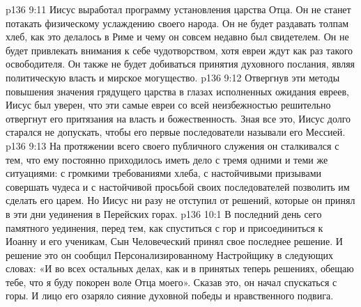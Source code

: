 \vs p136 9:11 Иисус выработал программу установления царства Отца. Он не станет потакать физическому услаждению своего народа. Он не будет раздавать толпам хлеб, как это делалось в Риме и чему он совсем недавно был свидетелем. Он не будет привлекать внимания к себе чудотворством, хотя евреи ждут как раз такого освободителя. Он также не будет добиваться принятия духовного послания, являя политическую власть и мирское могущество.
\vs p136 9:12 Отвергнув эти методы повышения значения грядущего царства в глазах исполненных ожидания евреев, Иисус был уверен, что эти самые евреи со всей неизбежностью решительно отвергнут его притязания на власть и божественность. Зная все это, Иисус долго старался не допускать, чтобы его первые последователи называли его Мессией.
\vs p136 9:13 На протяжении всего своего публичного служения он сталкивался с тем, что ему постоянно приходилось иметь дело с тремя одними и теми же ситуациями: с громкими требованиями хлеба, с настойчивыми призывами совершать чудеса и с настойчивой просьбой своих последователей позволить им сделать его царем. Но Иисус ни разу не отступил от решений, которые он принял в эти дни уединения в Перейских горах.
\vs p136 10:1 В последний день сего памятного уединения, перед тем, как спуститься с гор и присоединиться к Иоанну и его ученикам, Сын Человеческий принял свое последнее решение. И решение это он сообщил Персонализированному Настройщику в следующих словах: «И во всех остальных делах, как и в принятых теперь решениях, обещаю тебе, что я буду покорен воле Отца моего». Сказав это, он начал спускаться с горы. И лицо его озаряло сияние духовной победы и нравственного подвига.
